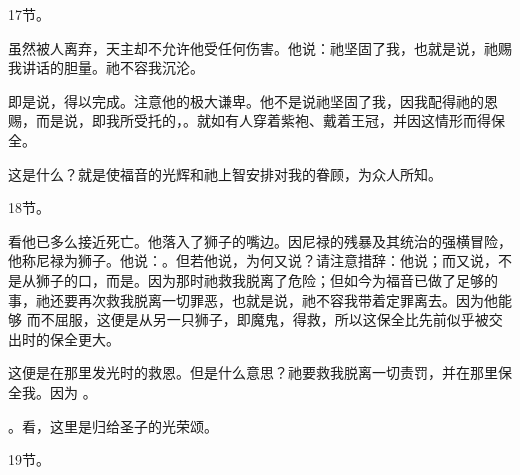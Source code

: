 17节。 \par

虽然被人离弃，天主却不允许他受任何伤害。他说：祂坚固了我，也就是说，祂赐我讲话的胆量。祂不容我沉沦。\par

\par

即是说，得以完成。注意他的极大谦卑。他不是说祂坚固了我，因我配得祂的恩赐，而是说，即我所受托的，。就如有人穿着紫袍、戴着王冠，并因这情形而得保全。\par

\par

这是什么？就是使福音的光辉和祂上智安排对我的眷顾，为众人所知。\par

\par

18节。 \par

看他已多么接近死亡。他落入了狮子的嘴边。因尼禄的残暴及其统治的强横冒险，他称尼禄为狮子。他说：。但若他说，为何又说？请注意措辞：他说；而又说，不是从狮子的口，而是。因为那时祂救我脱离了危险；但如今为福音已做了足够的事，祂还要再次救我脱离一切罪恶，也就是说，祂不容我带着定罪离去。因为他能够  而不屈服，这便是从另一只狮子，即魔鬼，得救，所以这保全比先前似乎被交出时的保全更大。\par

\par

这便是在那里发光时的救恩。但是什么意思？祂要救我脱离一切责罚，并在那里保全我。因为 。\par

。看，这里是归给圣子的光荣颂。\par

19节。 \par

